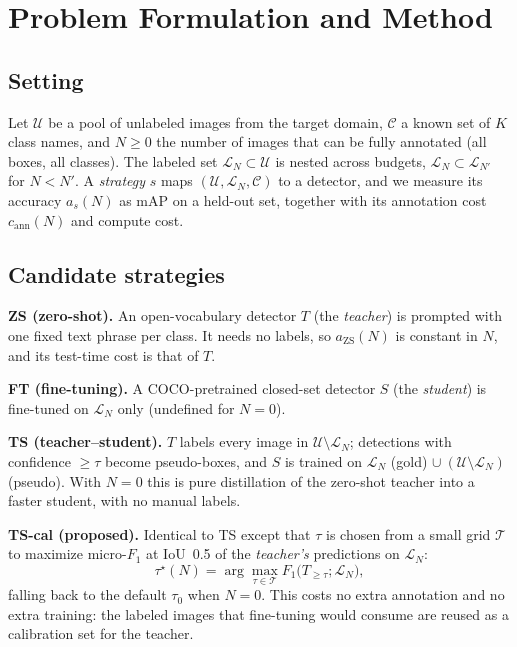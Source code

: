 \section{Problem Formulation and Method}
\subsection{Setting}
Let $\mathcal{U}$ be a pool of unlabeled images from the target domain, $\mathcal{C}$ a known set of $K$ class names, and $N\ge 0$ the number of images that can be fully annotated (all boxes, all classes). The labeled set $\mathcal{L}_N\subset\mathcal{U}$ is nested across budgets, $\mathcal{L}_{N}\subset\mathcal{L}_{N'}$ for $N<N'$. A \emph{strategy} $s$ maps $(\mathcal{U},\mathcal{L}_N,\mathcal{C})$ to a detector, and we measure its accuracy $a_s(N)$ as mAP on a held-out set, together with its annotation cost $c_{\text{ann}}(N)$ and compute cost.

\subsection{Candidate strategies}
\textbf{ZS (zero-shot).} An open-vocabulary detector $T$ (the \emph{teacher}) is prompted with one fixed text phrase per class. It needs no labels, so $a_{\text{ZS}}(N)$ is constant in $N$, and its test-time cost is that of $T$.

\textbf{FT (fine-tuning).} A COCO-pretrained closed-set detector $S$ (the \emph{student}) is fine-tuned on $\mathcal{L}_N$ only (undefined for $N=0$).

\textbf{TS (teacher--student).} $T$ labels every image in $\mathcal{U}\setminus\mathcal{L}_N$; detections with confidence $\ge\tau$ become pseudo-boxes, and $S$ is trained on $\mathcal{L}_N$ (gold) $\cup\ (\mathcal{U}\setminus\mathcal{L}_N)$ (pseudo). With $N=0$ this is pure distillation of the zero-shot teacher into a faster student, with no manual labels.

\textbf{TS-cal (proposed).} Identical to TS except that $\tau$ is chosen from a small grid $\mathcal{T}$ to maximize micro-$F_1$ at IoU~0.5 of the \emph{teacher's} predictions on $\mathcal{L}_N$:
\begin{equation}
\tau^\star(N)=\arg\max_{\tau\in\mathcal{T}} F_1\big(T_{\ge\tau};\mathcal{L}_N\big),
\end{equation}
falling back to the default $\tau_0$ when $N=0$. This costs no extra annotation and no extra training: the labeled images that fine-tuning would consume are reused as a calibration set for the teacher.

